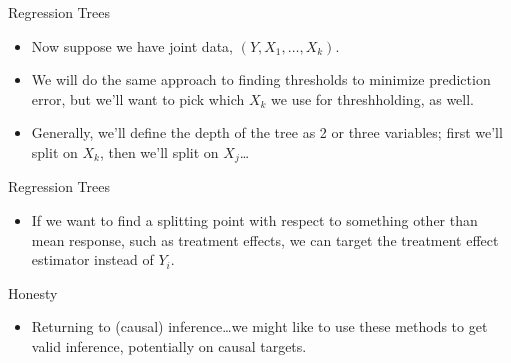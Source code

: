 \documentclass[xcolor={dvipsnames},handout]{beamer}
\begin{document}
\begin{frame}{Regression Trees}

\begin{itemize}
\item Now suppose we have joint data, $(Y,X_1, \dots, X_k)$.
\item We will do the same approach to finding thresholds to minimize prediction error, but we'll want to pick which $X_k$ we use for threshholding, as well.
\item Generally, we'll define the depth of the tree as 2 or three variables; first we'll split on $X_k$, then we'll split on $X_j$\dots
\end{itemize}


\end{frame}



\begin{frame}{Regression Trees}

\begin{itemize}
\item If we want to find a splitting point with respect to something other than mean response, such as treatment effects, we can target the treatment effect estimator instead of $Y_i$.
\end{itemize}

\end{frame}



\begin{frame}{Honesty}

\begin{itemize}
\item Returning to (causal) inference\dots  we might like to use these methods to get valid inference, potentially on causal targets.
\end{itemize}

\end{frame}
\end{document}
